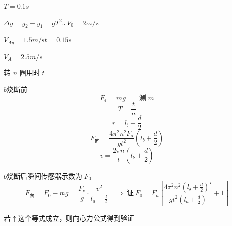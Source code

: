 \begin{problem}
$T=0.1\unit{s}$
\begin{solution}
$\Delta y=y_2-y_1=gT^2$\quad $\therefore\ V_0=2\unit{m/s}$

$V_{Ay}=1.5\unit{m/s}$\quad $t=0.15\unit{s}$

$V_A=2.5\unit{m/s}$
\end{solution}
\end{problem}



转 $n$ 圈用时 $t$

$b$烧断前
\[ F_a=mg\qquad \text{测 }m \]
\[ T=\frac{t}{n} \]
\[ r=l_b+\frac{d}{2} \]
\[ F_{\text{向}}=\frac{4\pi^2n^2F_a}{gt^2}\left(l_b+\frac{d}{2}\right) \]
\[ v=\frac{2\pi n}{t}\left(l_b+\frac{d}{2}\right) \]

$b$烧断后\quad 瞬间传感器示数为 $F_0$
\[ F_{\text{向}}=F_0-mg=\frac{F_a}{g}\cdot\frac{v^2}{l_a+\frac{d}{2}}\quad\Rightarrow\ \text{证}\ F_0=F_a\left[\frac{4\pi^2n^2\left(l_b+\frac{d}{2}\right)^2}{gt^2\left(l_a+\frac{d}{2}\right)}+1\right] \]

若$\uparrow$这个等式成立，则向心力公式得到验证

